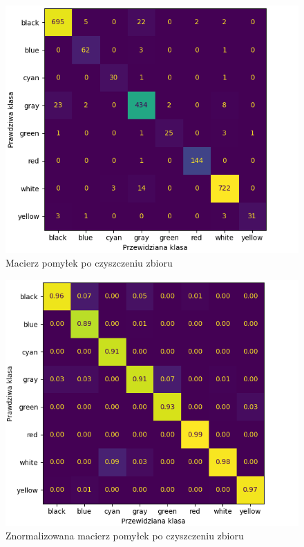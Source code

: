 \pagebreak

\begin{figure}[h!]
    \begin{center}
        \includegraphics[scale=0.78]{img/confusion_matrix_rework.png}        
    \end{center}
    \caption{Macierz pomyłek po czyszczeniu zbioru}
    \label{fig:confusion_rework}
\end{figure}

\begin{figure}[h!]
    \begin{center}
        \includegraphics[scale=0.78]{img/confusion_matrix_new_rework.png}
    \end{center}
    \caption{Znormalizowana macierz pomyłek po czyszczeniu zbioru}
    \label{fig:confusion_new_rework}
\end{figure}


